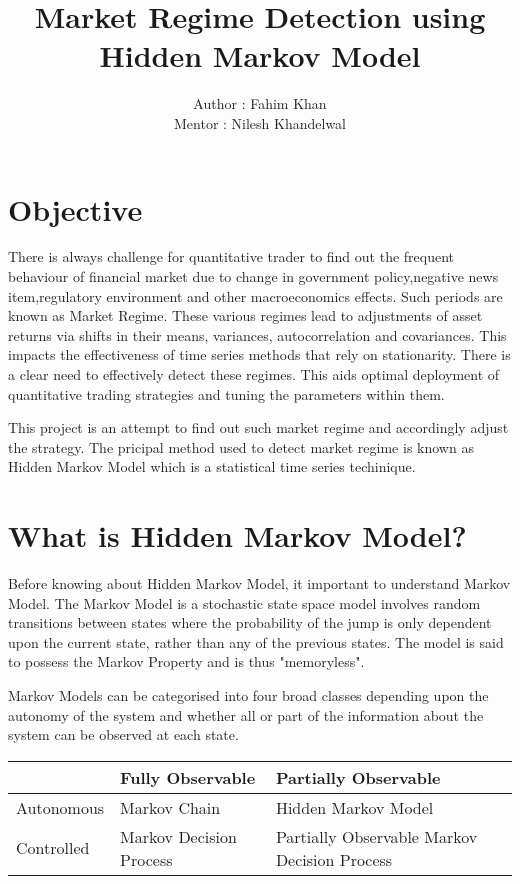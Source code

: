 \documentclass{report}
\author{Author : Fahim Khan \\
		Mentor : Nilesh Khandelwal
}
\title{Market Regime Detection using Hidden Markov Model}
\begin{document}
\maketitle
\tableofcontents



\chapter{Objective}
There is always challenge for quantitative trader to find out the frequent behaviour of financial market due to change in government policy,negative news item,regulatory environment and other macroeconomics effects. Such periods are known as Market Regime.
These various regimes lead to adjustments of asset returns via shifts in their means, variances,
autocorrelation and covariances. This impacts the effectiveness of time series methods that rely
on stationarity.
There is a clear need to effectively detect these regimes. This aids optimal deployment of
quantitative trading strategies and tuning the parameters within them.\par

This project is an attempt to find out such market regime and accordingly adjust the strategy. The pricipal method used to detect market regime is known as Hidden Markov Model which is a statistical time series techinique.


\chapter{What is Hidden Markov Model?}
Before knowing about Hidden Markov Model, it important to understand Markov Model. The Markov Model is a stochastic state space model involves random transitions between states where the probability of the jump is only dependent upon the current state, rather than any of the previous states. The model is said to possess the Markov Property and is thus "memoryless".

Markov Models can be categorised into four broad classes depending upon the autonomy
of the system and whether all or part of the information about the system can be observed at
each state.

 
 

\begin{tabu} to 0.8\textwidth { | X[l] | X[c] | X[r] | }
 \hline
  & Fully Observable & Partially Observable \\
 \hline
   Autonomous & Markov Chain  & Hidden Markov Model  \\
\hline
Controlled & Markov Decision Process  & Partially Observable Markov Decision Process \\
\hline
\end{tabu}
\end{document}
